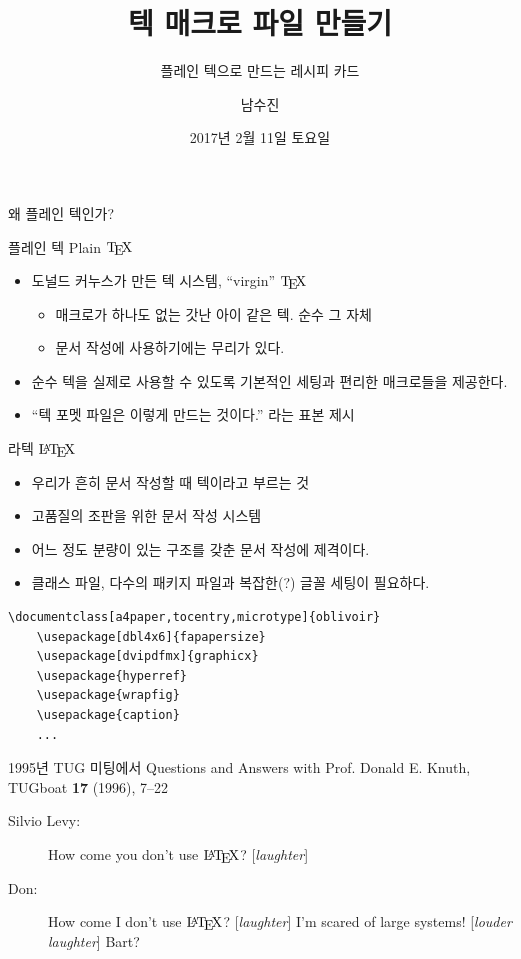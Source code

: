 \documentclass{beamer}
\title{텍 매크로 파일 만들기}
\subtitle{플레인 텍으로 만드는 레시피 카드}
\date{2017년 2월 11일 토요일}
\author{남수진}
\institute{
  2017 한국텍학회 학술대회 및 정기총회 \\
  동국대학교 법학관 B253호}
\def\TEX/{$\textrm{\TeX}$}
\def\LATEX/{$\textrm{\LaTeX}$}
\begin{document}
\maketitle

%
\begin{frame}[standout]
  왜 플레인 텍인가?
\end{frame}


%
\begin{frame}[fragile]{플레인 텍 Plain \TEX/}
  \begin{itemize}
  \item 도널드 커누스가 만든 텍 시스템, \alert{``virgin'' \TEX/}
    \begin{itemize}
    \item 매크로가 하나도 없는 갓난 아이 같은 텍. 순수 그 자체
    \item 문서 작성에 사용하기에는 무리가 있다.
    \end{itemize}
  \item 순수 텍을 실제로 사용할 수 있도록 기본적인 세팅과 편리한 매크로들을 제공한다.
  \item ``텍 포멧 파일은 이렇게 만드는 것이다.'' 라는 표본 제시
  \end{itemize}
\end{frame}


%
\begin{frame}[fragile]{라텍 \LATEX/}
  \begin{itemize}
  \item 우리가 흔히 문서 작성할 때 텍이라고 부르는 것
  \item 고품질의 조판을 위한 문서 작성 시스템
  \item 어느 정도 분량이 있는 구조를 갖춘 문서 작성에 제격이다.
  \item 클래스 파일, 다수의 패키지 파일과 복잡한(?) 글꼴 세팅이 필요하다.
  \end{itemize}
  
  \begin{Verbatim}[fontsize=\small]
    \documentclass[a4paper,tocentry,microtype]{oblivoir}
    \usepackage[dbl4x6]{fapapersize}
    \usepackage[dvipdfmx]{graphicx}
    \usepackage{hyperref}
    \usepackage{wrapfig}
    \usepackage{caption}
    ...
  \end{Verbatim}
\end{frame}


%
\begin{frame}{1995년 TUG 미팅에서}
  Questions and Answers with Prof. Donald E. Knuth, 
  TUGboat \textbf{17} (1996), 7--22
  \begin{description}
  \item[Silvio Levy:] How come you don't use \LATEX/? [\textsl{laughter}]
  \item[Don:] How come I don't use \LATEX/? [\textsl{laughter}]
    I'm scared of \alert{large systems!} [\textsl{louder laughter\/}]
    Bart?
  \end{description}
\end{frame}
\end{document}
